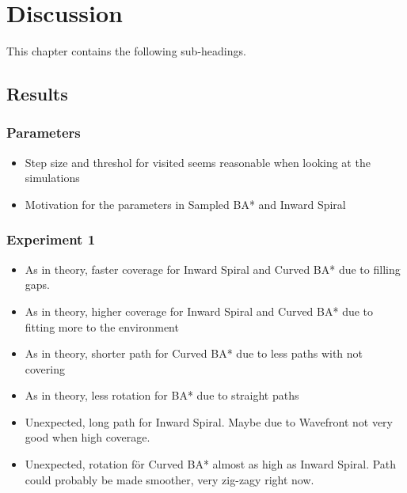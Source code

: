 
\chapter{Discussion}
\label{cha:discussion}

This chapter contains the following sub-headings.

\section{Results}
\label{sec:discussion-results}
\subsection{Parameters}
\begin{itemize}
    \item Step size and threshol for visited seems reasonable when looking at the simulations
    \item Motivation for the parameters in Sampled BA* and Inward Spiral
\end{itemize}

\subsection{Experiment 1}
\begin{itemize}
    \item As in theory, faster coverage for Inward Spiral and Curved BA* due to filling gaps.
    \item As in theory, higher coverage for Inward Spiral and Curved BA* due to fitting more to the environment
    \item As in theory, shorter path for Curved BA* due to less paths with not covering
    \item As in theory, less rotation for BA* due to straight paths
    \item Unexpected, long path for Inward Spiral. Maybe due to Wavefront not very good when high coverage.
    \item Unexpected, rotation för Curved BA* almost as high as Inward Spiral. Path could probably be made smoother, very zig-zagy right now.
\end{itemize}

